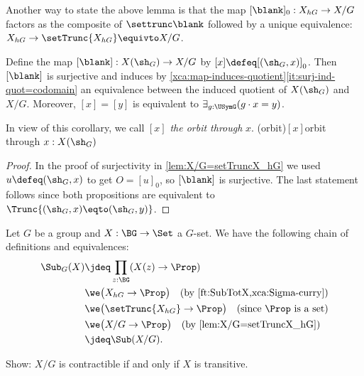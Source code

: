 Another way to state the above lemma is that the map 
$[\blank]_0 :X_{hG}\to X/G$ factors as the composite of $\settrunc\blank$
followed by a unique equivalence: $X_{hG}\to \setTrunc{X_{hG}}\equivto X/G$.

\begin{corollary}\label{cor:orbit-equiv}
Define the map $[\blank] : X(\sh_G) \to X/G$ by $[x]\defeq[(\sh_G,x)]_0$.
Then $[\blank]$ is surjective and induces
by \cref{xca:map-induces-quotient}\ref{it:surj-ind-quot=codomain}
an equivalence between the induced quotient of $X(\sh_G)$ and $X/G$.
Moreover, $[x] = [y]$ is equivalent to $\exists_{g:\USymG}(g\cdot x = y)$.
\end{corollary}

In view of this corollary, we call $[x]$ \emph{the orbit
through} $x$. \glossary(orbit){$[x]$}{orbit through $x:X(\sh_G)$}
\begin{proof}
In the proof of surjectivity in \cref{lem:X/G=setTruncX_hG} we used
$u\defeq(\sh_G,x)$ to get $O=[u]_0$, so $[\blank]$ is surjective. 
The last statement follows since
both propositions are equivalent to $\Trunc{(\sh_G,x)\eqto(\sh_G,y)}$.
\end{proof}

\begin{remark}\label{rem:SubGX=Sub(X/G)}
Let $G$ be a group and $X : \BG\to\Set$ a $G$-set.
We have the following chain of definitions and equivalences:
\begin{align*}
\Sub_G(X)&\jdeq \prod_{z:\BG}(X(z)\to\Prop) 
\\
         & \we \bigl(X_{hG}\to\Prop\bigr)
               \quad\text{(by \cref{ft:SubTotX,xca:Sigma-curry})}
\\
         & \we \bigl(\setTrunc{X_{hG}}\to\Prop\bigr) 
               \quad\text{(since $\Prop$ is a set)}
\\        
         & \we \bigl(X/G\to\Prop\bigr)
               \quad\text{(by \cref{lem:X/G=setTruncX_hG})}
\\
         & \jdeq \Sub(X/G).\qedhere
\end{align*}
\end{remark}

\begin{xca}\label{xca:transX-just1orbit}
Show: $X/G$ is contractible if and only if $X$ is transitive.
\end{xca}


